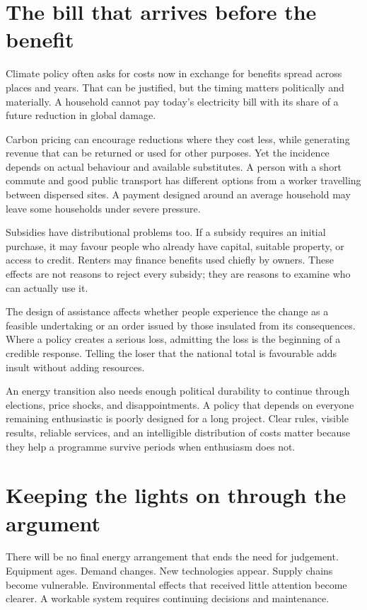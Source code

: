 \documentclass[12pt,a4paper]{book}
\begin{document}
\section*{The bill that arrives before the benefit}

Climate policy often asks for costs now in exchange for benefits spread across places and years. That can be justified, but the timing matters politically and materially. A household cannot pay today's electricity bill with its share of a future reduction in global damage.

Carbon pricing can encourage reductions where they cost less, while generating revenue that can be returned or used for other purposes. Yet the incidence depends on actual behaviour and available substitutes. A person with a short commute and good public transport has different options from a worker travelling between dispersed sites. A payment designed around an average household may leave some households under severe pressure.

Subsidies have distributional problems too. If a subsidy requires an initial purchase, it may favour people who already have capital, suitable property, or access to credit. Renters may finance benefits used chiefly by owners. These effects are not reasons to reject every subsidy; they are reasons to examine who can actually use it.

The design of assistance affects whether people experience the change as a feasible undertaking or an order issued by those insulated from its consequences. Where a policy creates a serious loss, admitting the loss is the beginning of a credible response. Telling the loser that the national total is favourable adds insult without adding resources.

An energy transition also needs enough political durability to continue through elections, price shocks, and disappointments. A policy that depends on everyone remaining enthusiastic is poorly designed for a long project. Clear rules, visible results, reliable services, and an intelligible distribution of costs matter because they help a programme survive periods when enthusiasm does not.

\section*{Keeping the lights on through the argument}

There will be no final energy arrangement that ends the need for judgement. Equipment ages. Demand changes. New technologies appear. Supply chains become vulnerable. Environmental effects that received little attention become clearer. A workable system requires continuing decisions and maintenance.
\end{document}
